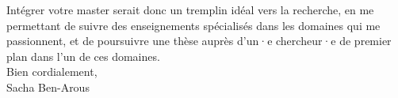 \documentclass[12pt,a4paper]{article}
\begin{document}
Intégrer votre master serait donc un tremplin idéal vers la recherche, en me permettant de suivre des enseignements spécialisés dans les domaines qui me passionnent, et de poursuivre une thèse auprès d’un·e chercheur·e de premier plan dans l’un de ces domaines. \\

\noindent Bien cordialement,\\
Sacha Ben-Arous
\end{document}
